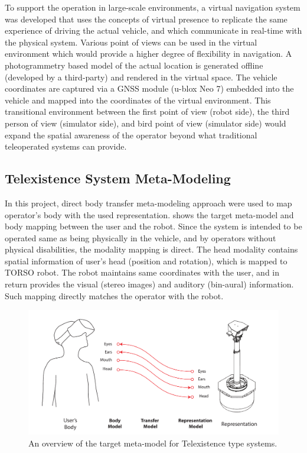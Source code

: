 To support the operation in large-scale environments, a virtual navigation system was developed  that uses the concepts of virtual presence to replicate the same experience of driving the actual vehicle, and which communicate in real-time with the physical system. Various point of views can be used in the virtual environment which would provide a higher degree of flexibility in navigation. A photogrammetry based model of the actual location is generated offline (developed by a third-party) and rendered in the virtual space. The vehicle coordinates are captured via a GNSS module (u-blox Neo 7) embedded into the vehicle and mapped into the coordinates of the virtual environment. This transitional environment between the first point of view (robot side), the third person of view (simulator side), and bird point of view (simulator side) would expand the spatial awareness of the operator beyond what traditional teleoperated systems can provide. %


\subsection{Telexistence System Meta-Modeling}

In this project, direct body transfer meta-modeling approach were used to map operator's body with the used representation.  shows the target meta-model and body mapping between the user and the robot. Since the system is intended to be operated same as being physically in the vehicle, and by operators without physical disabilities, the modality mapping is direct. The head modality contains spatial information of user's head (position and rotation), which is mapped to TORSO robot. The robot maintains same coordinates with the user, and in return provides the visual (stereo images) and auditory (bin-aural) information. Such mapping directly matches the operator with the robot. 

\begin{figure}[htpb]
  \centering
  \includegraphics[width=0.95\linewidth]{figures/eval/EDD/EDD-NEDO.pdf}
  \captionsetup{justification=centering}
  \caption{An overview of the target meta-model for Telexistence type systems.}
  \label{fig:eval-EDD-NEDO}
\end{figure}

